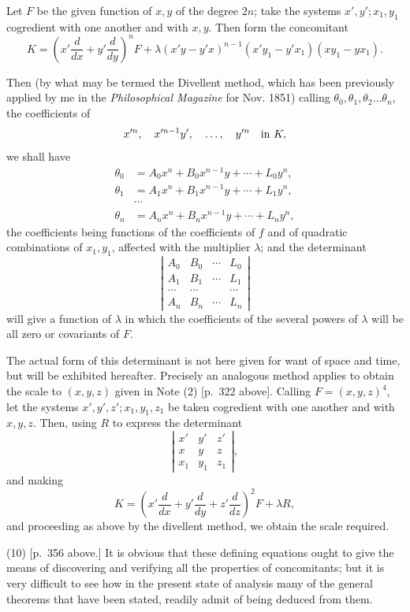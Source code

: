 \documentclass[11pt]{article}
\newcommand{\sourcepage}[1]{\marginpar{\scriptsize p.~#1}}
\begin{document}
Let $F$ be the given function of $x,y$ of the degree $2n$; take the systems $x',y';x_1,y_1$ cogredient with one another and with $x,y$. Then form the concomitant
\[
K=\left(x'\frac{d}{dx}+y'\frac{d}{dy}\right)^nF+
\lambda(x'y-y'x)^{n-1}(x'y_1-y'x_1)(xy_1-yx_1).
\]

\sourcepage{361}
Then (by what may be termed the Divellent method, which has been previously applied by me in the \emph{Philosophical Magazine} for Nov. 1851) calling $\theta_0,\theta_1,\theta_2\ldots\theta_n$, the coefficients of
\[
x'^n,
\quad x'^{n-1}y',
\quad \ldots,
\quad y'^n
\quad\hbox{in }K,
\]
we shall have
\[
\begin{aligned}
\theta_0&=A_0x^n+B_0x^{n-1}y+\cdots+L_0y^n,\\
\theta_1&=A_1x^n+B_1x^{n-1}y+\cdots+L_1y^n,\\
&\cdots\\
\theta_n&=A_nx^n+B_nx^{n-1}y+\cdots+L_ny^n,
\end{aligned}
\]
the coefficients being functions of the coefficients of $f$ and of quadratic combinations of $x_1,y_1$, affected with the multiplier $\lambda$; and the determinant
\[
\left|\begin{array}{cccc}
A_0&B_0&\cdots&L_0\\
A_1&B_1&\cdots&L_1\\
\cdots&\cdots&&\cdots\\
A_n&B_n&\cdots&L_n
\end{array}\right|
\]
will give a function of $\lambda$ in which the coefficients of the several powers of $\lambda$ will be all zero or covariants of $F$.

The actual form of this determinant is not here given for want of space and time, but will be exhibited hereafter. Precisely an analogous method applies to obtain the scale to $(x,y,z)$ given in Note (2) [p.~322 above]. Calling $F=(x,y,z)^4$, let the systems $x',y',z';x_1,y_1,z_1$ be taken cogredient with one another and with $x,y,z$. Then, using $R$ to express the determinant
\[
\left|\begin{array}{ccc}
x'&y'&z'\\
x&y&z\\
x_1&y_1&z_1
\end{array}\right|,
\]
and making
\[
K=\left(x'\frac{d}{dx}+y'\frac{d}{dy}+z'\frac{d}{dz}\right)^2F+\lambda R,
\]
and proceeding as above by the divellent method, we obtain the scale required.

(10) [p.~356 above.] It is obvious that these defining equations ought to give the means of discovering and verifying all the properties of concomitants; but it is very difficult to see how in the present state of analysis many of the general theorems that have been stated, readily admit of being deduced from them.
\end{document}
